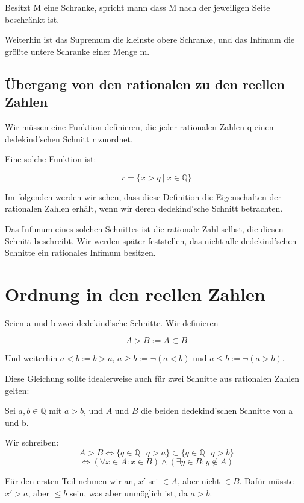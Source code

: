 \documentclass[12pt]{article}
\begin{document}
    Besitzt M eine Schranke, spricht mann dass M nach der jeweiligen Seite beschränkt ist.

    Weiterhin ist das Supremum die kleinste obere Schranke, und das Infimum die größte untere Schranke einer Menge m.

    \newpage

    \subsection{Übergang von den rationalen zu den reellen Zahlen}

    Wir müssen eine Funktion definieren, die jeder rationalen Zahlen q einen dedekind'schen Schnitt r zuordnet.

    Eine solche Funktion ist:

    \[r = \{x > q \mspace{4mu} | \mspace{4mu} x \in \mathbb{Q}\}\]

    Im folgenden werden wir sehen, dass diese Definition die Eigenschaften der rationalen Zahlen erhält, wenn
    wir deren dedekind'sche Schnitt betrachten.

    Das Infimum eines solchen Schnittes ist die rationale Zahl selbst, die diesen Schnitt beschreibt.
    Wir werden später feststellen, das nicht alle dedekind'schen Schnitte ein rationales Infimum besitzen.

    \section{Ordnung in den reellen Zahlen}

    Seien a und b zwei dedekind'sche Schnitte. Wir definieren

    \[A > B := A \subset B\]

    Und weiterhin $a < b := b > a$, $a \ge b := \lnot (a < b)$ und $a \le b := \lnot (a > b)$.

    Diese Gleichung sollte idealerweise auch für zwei Schnitte aus rationalen Zahlen gelten:

    Sei $a, b \in \mathbb{Q}$ mit $a > b$, und $A$ und $B$ die beiden dedekind'schen Schnitte von a und b.

    Wir schreiben:
    \[
        A > B \Leftrightarrow \{q \in \mathbb{Q} \mspace{4mu} | \mspace{4mu} q > a\} \subset
        \{q \in \mathbb{Q} \mspace{4mu} | \mspace{4mu} q > b\}
    \]
    \[
        \Leftrightarrow (\forall x \in A: x \in B) \land (\exists y \in B: y \not \in A)
    \]

    Für den ersten Teil nehmen wir an, $x'$ sei $\in A$, aber nicht $\in B$.
    Dafür müsste $x' > a$, aber $\le b$ sein, was aber unmöglich ist, da $a > b$.
\end{document}
